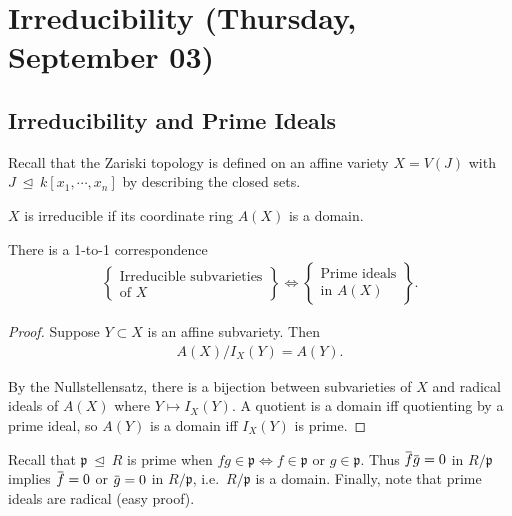 \hypertarget{irreducibility-thursday-september-03}{%
\section{Irreducibility (Thursday, September
03)}\label{irreducibility-thursday-september-03}}

\hypertarget{irreducibility-and-prime-ideals}{%
\subsection{Irreducibility and Prime
Ideals}\label{irreducibility-and-prime-ideals}}

Recall that the Zariski topology is defined on an affine variety
\(X = V(J)\) with \(J {~\trianglelefteq~}k[x_1, \cdots, x_n]\) by
describing the closed sets.

\begin{proposition}[?]

\(X\) is irreducible if its coordinate ring \(A(X)\) is a domain.

\end{proposition}

\begin{proposition}[?]

There is a 1-to-1 correspondence
\begin{align*}  
\left\{{\substack{\text{Irreducible subvarieties} \\ \text{of }X}}\right\}
\iff
\left\{{\substack{\text{Prime ideals} \\ \text{in }A(X)}}\right\}
.\end{align*}

\end{proposition}

\begin{proof}

Suppose \(Y\subset X\) is an affine subvariety. Then
\begin{align*}  
A(X) / I_X(Y) = A(Y)
.\end{align*}

By the Nullstellensatz, there is a bijection between subvarieties of
\(X\) and radical ideals of \(A(X)\) where \(Y\mapsto I_X(Y)\). A
quotient is a domain iff quotienting by a prime ideal, so \(A(Y)\) is a
domain iff \(I_X(Y)\) is prime.

\end{proof}

Recall that \({\mathfrak{p}}{~\trianglelefteq~}R\) is prime when
\(fg\in {\mathfrak{p}}\iff f\in {\mathfrak{p}}\) or
\(g\in {\mathfrak{p}}\). Thus
\(\mkern 1.5mu\overline{\mkern-1.5muf\mkern-1.5mu}\mkern 1.5mu \mkern 1.5mu\overline{\mkern-1.5mug\mkern-1.5mu}\mkern 1.5mu = 0\)
in \(R/{\mathfrak{p}}\) implies
\(\mkern 1.5mu\overline{\mkern-1.5muf\mkern-1.5mu}\mkern 1.5mu = 0\) or
\(\mkern 1.5mu\overline{\mkern-1.5mug\mkern-1.5mu}\mkern 1.5mu = 0\) in
\(R/{\mathfrak{p}}\), i.e.~\(R/{\mathfrak{p}}\) is a domain. Finally,
note that prime ideals are radical (easy proof).

